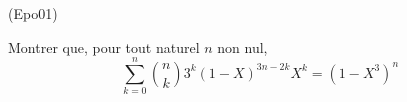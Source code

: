 \begin{tiny}(Epo01)\end{tiny} Montrer que, pour tout naturel $n$ non nul,
\[
\sum_{k=0}^{n}\binom{n}{k}3^{k}(1-X)^{3n-2k}X^{k}=(1-X^{3})^{n}
\]